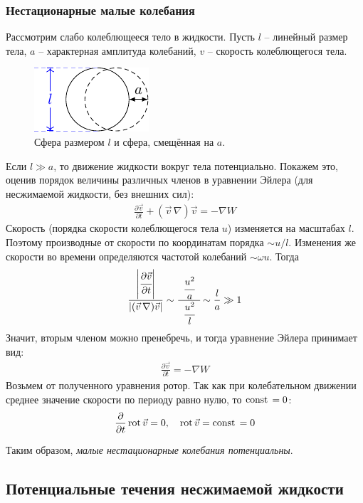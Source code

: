\subsubsection{Нестационарные малые колебания}
Рассмотрим слабо колеблющееся тело в жидкости. Пусть $l$ -- линейный размер тела, $a$ -- характерная амплитуда колебаний, $v$ -- скорость колеблющегося тела.
\begin{figure}[H]
	\centering
	\includegraphics[scale=1.5]{img/sphere}
	\caption{Сфера размером $l$ и сфера, смещённая на $a$.}
	\label{fig:figure15}
\end{figure}
Если $l \gg a$, то движение жидкости вокруг тела потенциально. Покажем это, оценив порядок величины различных членов в уравнении Эйлера (для несжимаемой жидкости, без внешних сил):
\begin{align*}
\frac { \partial \vec{v} } { \partial t } + ( \vec{v}\,\nabla ) \vec{v} = - \nabla W
\end{align*}
Скорость (порядка скорости колеблющегося тела $u$) изменяется на  масштабах $l$. Поэтому производные от скорости по координатам порядка $\sim u/l$. Изменения же скорости во времени определяются частотой колебаний $\sim \omega u$. Тогда
\begin{align*}
\frac{
\left| \cfrac { \partial \vec{v} } { \partial t } \right|} {\left| (\vec{v}\,\nabla ) \vec{v} \right|} \sim \cfrac{\phantom{a}\cfrac { u ^ { 2 } } { a }\phantom{a}} { \cfrac { u ^ { 2 } }{ l } } \sim \frac { l } { a } \gg 1
\end{align*}
Значит, вторым членом можно пренебречь, и тогда уравнение Эйлера принимает вид:
\begin{align*}
\frac { \partial \vec{v} } { \partial t } = - \nabla W
\end{align*}
Возьмем от полученного уравнения ротор. Так как при колебательном движении среднее значение скорости по периоду равно нулю, то $\mathrm{const}\,=0$:
\begin{align*}
\pdv{t}  \operatorname{rot}  \vec{v} = 0 , \quad\operatorname{rot}\vec{v} =  \mathrm{const}\,  = 0
\end{align*}


Таким образом, \textit{малые нестационарные колебания потенциальны}.


\subsection{Потенциальные течения несжимаемой жидкости}

